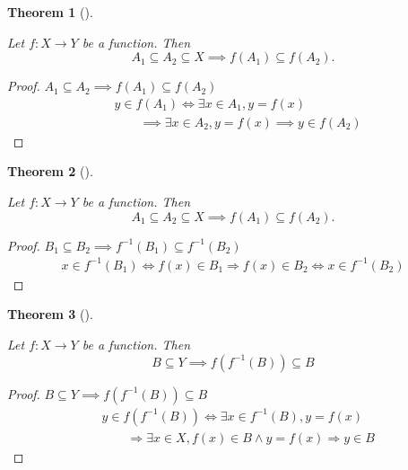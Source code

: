 \documentclass[
  letterpaper,
  10pt,
  reqno,
  twopage,
  openany]{book}
\theoremstyle{plain}
\theoremstyle{definition}
\theoremstyle{definition}
\theoremstyle{definition}
\theoremstyle{plain}
\theoremstyle{plain}
\newtheorem{theorem}{Theorem}[chapter]
\theoremstyle{remark}
\begin{document}
\leavevmode{}%
\begin{theorem}[]\label{thm-subseteq-implies}

Let \(f:X\to Y\) be a function. Then \[
A_1\subseteq A_2\subseteq X\implies f(A_1)\subseteq f(A_2).
\]

\end{theorem}

\begin{proof}

\(A_1\subseteq A_2\implies f(A_1)\subseteq f(A_2)\) \begin{align*}
& y\in f(A_1) \Leftrightarrow \exists x\in A_1, y=f(x) 
\\ & \qquad 
\implies \exists x\in A_2, y=f(x) \implies y\in f(A_2) 
\end{align*}

\end{proof}

\leavevmode{}%
\begin{theorem}[]\label{thm-subseteq-subseteq-implies}

Let \(f:X\to Y\) be a function. Then \[
A_1\subseteq A_2\subseteq X\implies f(A_1)\subseteq f(A_2).
\]

\end{theorem}

\begin{proof}

\(B_1\subseteq B_2\implies f^{-1}(B_1)\subseteq f^{-1}(B_2)\)
\begin{align*}
x\in f^{-1}(B_1) 
\Leftrightarrow   f(x)\in B_1 
\Longrightarrow   f(x)\in B_2
\Leftrightarrow   x\in f^{-1}(B_2)
\end{align*}

\end{proof}

\leavevmode{}%
\begin{theorem}[]\label{thm-preimage-subseteq}

Let \(f:X\to Y\) be a function. Then \[
B\subseteq Y  \implies  f(f^{-1}(B))\subseteq B
\]

\end{theorem}

\begin{proof}

\(B\subseteq Y \implies f(f^{-1}(B))\subseteq B\) \begin{align*}
& y\in f(f^{-1}(B))
\Leftrightarrow   \exists x\in f^{-1}(B), y=f(x) 
\\ & \qquad 
\Longrightarrow   \exists x\in X, f(x)\in B \land y=f(x)
\Longrightarrow  y\in B 
\end{align*}

\end{proof}
\end{document}
